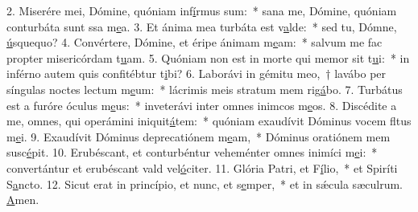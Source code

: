 2. Miserére mei, Dómine, quóniam inf\uline{í}rmus sum:~* sana me, Dómine, quóniam conturbáta sunt ssa m\uline{e}a.
3. Et ánima mea turbáta est v\uline{a}lde:~* sed tu, Dómne, \uline{ú}squequo?
4. Convértere, Dómine, et éripe ánimam m\uline{e}am:~* salvum me fac propter misericórdam t\uline{u}am.
5. Quóniam non est in morte qui memor sit t\uline{u}i:~* in inférno autem quis confitébtur t\uline{i}bi?
6. Laborávi in gémitu meo,~† lavábo per síngulas noctes lectum m\uline{e}um:~* lácrimis meis stratum mem rig\uline{á}bo.
7. Turbátus est a furóre óculus m\uline{e}us:~* inveterávi inter omnes inimcos m\uline{e}os.
8. Discédite a me, omnes, qui operámini iniquit\uline{á}tem:~* quóniam exaudívit Dóminus vocem fltus m\uline{e}i.
9. Exaudívit Dóminus deprecatiónem m\uline{e}am,~* Dóminus oratiónem mem susc\uline{é}pit.
10. Erubéscant, et conturbéntur veheménter omnes inimíci m\uline{e}i:~* convertántur et erubéscant vald vel\uline{ó}citer.
11. Glória Patri, et F\uline{í}lio,~* et Spiríti S\uline{a}ncto.
12. Sicut erat in princípio, et nunc, et s\uline{e}mper,~* et in sǽcula sæculrum. \uline{A}men.
